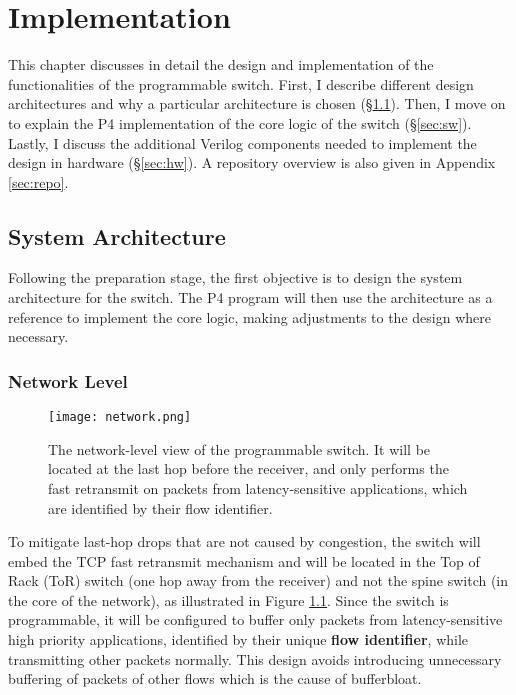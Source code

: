 \chapter{Implementation}
This chapter discusses in detail the design and implementation of the functionalities of the programmable switch. First, I describe different design architectures and why a particular architecture is chosen (\S\ref{sec:arch-design}). Then, I move on to explain the P4 implementation of the core logic of the switch (\S\ref{sec:sw}). Lastly, I discuss the additional Verilog components needed to implement the design in hardware (\S\ref{sec:hw}). A repository overview is also given in Appendix \ref{sec:repo}.

\section{System Architecture}
\label{sec:arch-design}
Following the preparation stage, the first objective is to design the system architecture for the switch. The P4 program will then use the architecture as a reference to implement the core logic, making adjustments to the design where necessary.

\subsection{Network Level}
\begin{figure}[!h]
	\centering
	\texttt{[image: network.png]}
	\caption{The network-level view of the programmable switch. It will be located at the last hop before the receiver, and only performs the fast retransmit on packets from latency-sensitive applications, which are identified by their flow identifier.}
	\label{fig:network}
\end{figure}

To mitigate last-hop drops that are not caused by congestion, the switch will embed the TCP fast retransmit mechanism and will be located in the Top of Rack (ToR) switch (one hop away from the receiver) and not the spine switch (in the core of the network), as illustrated in Figure \ref{fig:network}. Since the switch is programmable, it will be configured to buffer only packets from latency-sensitive high priority applications, identified by their unique \textbf{flow identifier}, while transmitting other packets normally. This design avoids introducing unnecessary buffering of packets of other flows which is the cause of bufferbloat.

